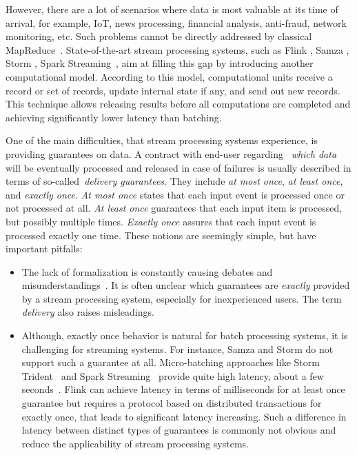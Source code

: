 However, there are a lot of scenarios where data is most valuable at its time of arrival, for example, IoT, news processing, financial analysis, anti-fraud, network monitoring, etc. Such problems cannot be directly addressed by classical MapReduce~\cite{Doulkeridis:2014:SLA:2628707.2628782}. State-of-the-art stream processing systems, such as Flink \cite{carbone2015apache}, Samza \cite{Noghabi:2017:SSS:3137765.3137770}, Storm \cite{apache:storm}, Spark Streaming~\cite{Zaharia:2012:DSE:2342763.2342773}, aim at filling this gap by introducing another computational model. According to this model, computational units receive a record or set of records, update internal state if any, and send out new records. This technique allows releasing results before all computations are completed and achieving significantly lower latency than batching. 

One of the main difficulties, that stream processing systems experience, is providing guarantees on data. A contract with end-user regarding ~{\em which data} will be eventually processed and released in case of failures is usually described in terms of so-called~{\em delivery guarantees}. They include {\em at most once}, {\em at least once}, and {\em exactly once}. {\it At most once} states that each input event is processed once or not processed at all. {\it At least once} guarantees that each input item is processed, but possibly multiple times. {\it Exactly once} assures that each input event is processed exactly one time. These notions are seemingly simple, but have important pitfalls:

\begin{itemize}
    \item The lack of formalization is constantly causing debates and misunderstandings~\cite{JerryPengStreamIO, PaperTrail}. It is often unclear which guarantees are {\em exactly} provided by a stream processing system, especially for inexperienced users. The term {\em delivery} also raises misleadings.  
    \item Although, exactly once behavior is natural for batch processing systems, it is challenging for streaming systems. For instance, Samza and Storm do not support such a guarantee at all. Micro-batching approaches like Storm Trident~\cite{apache:storm:trident} and Spark Streaming~\cite{Zaharia:2012:DSE:2342763.2342773} provide quite high latency, about a few seconds~\cite{7530084, 7474816}. Flink can achieve latency in terms of milliseconds for at least once guarantee but requires a protocol based on distributed transactions for exactly once, that leads to significant latency increasing. Such a difference in latency between distinct types of guarantees is commonly not obvious and reduce the applicability of stream processing systems.
\end{itemize}

